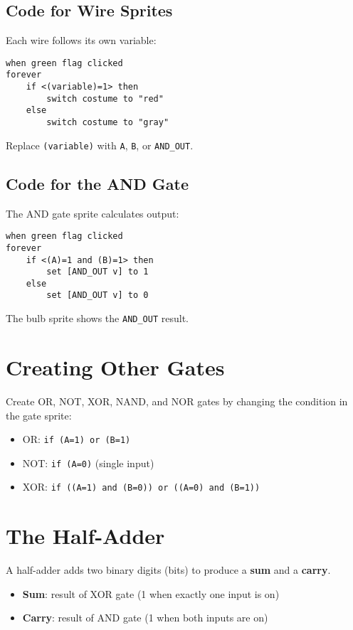 \documentclass[12pt]{article}
\begin{document}
\subsection*{Code for Wire Sprites}
Each wire follows its own variable:
\begin{verbatim}
when green flag clicked
forever
    if <(variable)=1> then
        switch costume to "red"
    else
        switch costume to "gray"
\end{verbatim}
Replace \texttt{(variable)} with \texttt{A}, \texttt{B}, or \texttt{AND\_OUT}.

\subsection*{Code for the AND Gate}
The AND gate sprite calculates output:
\begin{verbatim}
when green flag clicked
forever
    if <(A)=1 and (B)=1> then
        set [AND_OUT v] to 1
    else
        set [AND_OUT v] to 0
\end{verbatim}

The bulb sprite shows the \texttt{AND\_OUT} result.

\section*{Creating Other Gates}
Create OR, NOT, XOR, NAND, and NOR gates by changing the condition in the gate sprite:
\begin{itemize}
    \item OR: \texttt{if (A=1) or (B=1)}
    \item NOT: \texttt{if (A=0)} (single input)
    \item XOR: \texttt{if ((A=1) and (B=0)) or ((A=0) and (B=1))}
\end{itemize}

\section*{The Half-Adder}

A half-adder adds two binary digits (bits) to produce a \textbf{sum} and a \textbf{carry}.

\begin{itemize}
    \item \textbf{Sum}: result of XOR gate (1 when exactly one input is on)
    \item \textbf{Carry}: result of AND gate (1 when both inputs are on)
\end{itemize}
\end{document}
